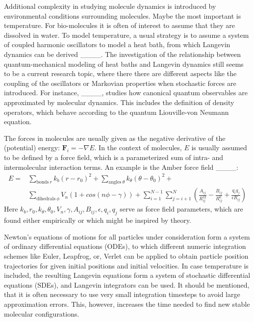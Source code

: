 Additional complexity in studying molecule dynamics is introduced by environmental conditions surrounding molecules. Maybe the most important is temperature. For bio-molecules it is often of interest to assume that they are dissolved in water. To model temperature, a usual strategy is to assume a system of coupled harmonic oscillators to model a heat bath, from which Langevin dynamics can be derived ____. The investigation of the relationship between quantum-mechanical modeling of heat baths and Langevin dynamics still seems to be a current research topic, where there there are different aspects like the coupling of the oscillators or Markovian properties when stochastic forces are introduced. For instance, ____, studies how canonical quantum observables are approximated by molecular dynamics. This includes the definition of density operators, which behave according to the quantum Liouville-von Neumann equation. 

The forces in molecules are usually given as the negative derivative of the (potential) energy: $\mathbf{F}_i=- \nabla E$. In the context of molecules, $E$ is usually assumed to be defined by a force field, which is a parameterized sum of intra- and intermolecular interaction terms. An example is the Amber force field ____:
\begin{align}
E=&\sum_{\text{bonds} \ r} k_b (r-r_0)^2+\sum_{\text{angles} \ \theta} k_{\theta} (\theta-\theta_0)^2+\\ \nonumber &\sum_{\text{dihedrals} \ \phi} V_n (1+cos(n \phi - \gamma))+\sum_{i=1}^{N-1} \sum_{j=i+1}^{N} \left( \frac{A_{ij}}{R_{ij}^{12}}-\frac{B_{ij}}{R_{ij}^6}+\frac{q_i q_j}{\epsilon R_{ij}}\right)
\end{align}
Here $k_b, r_0, k_{\theta}, \theta_0, V_n, \gamma, A_{ij}, B_{ij}, \epsilon, q_i, q_j$ serve as force field parameters, which are found either empirically or which might be inspired by theory.

Newton's equations of motions for all particles under consideration form a system of ordinary differential equations (ODEs), to which different numeric integration schemes like Euler, Leapfrog, or, Verlet can be applied to obtain particle position trajectories for given initial positions and initial velocities. In case temperature is included, the resulting Langevin equations form a system of stochastic differential equations (SDEs), and Langevin integrators can be used. It should be mentioned, that it is often necessary to use very small integration timesteps to avoid large approximation errors. This, however, increases the time needed to find new stable molecular configurations.

